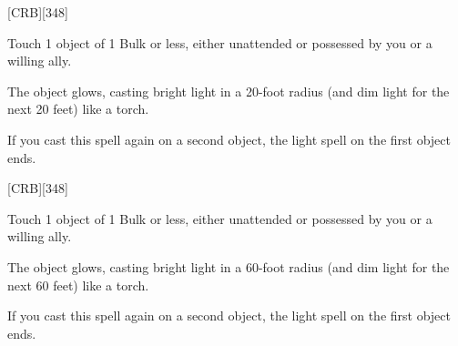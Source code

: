 
[CRB][348]




Touch 1 object of 1 Bulk or less, either unattended or possessed by you or a willing ally.

The object glows, casting bright light in a 20-foot radius (and dim light for the next 20 feet) like a torch.

If you cast this spell again on a second object, the light spell on the first object ends.


[CRB][348]




Touch 1 object of 1 Bulk or less, either unattended or possessed by you or a willing ally.

The object glows, casting bright light in a 60-foot radius (and dim light for the next 60 feet) like a torch.

If you cast this spell again on a second object, the light spell on the first object ends.